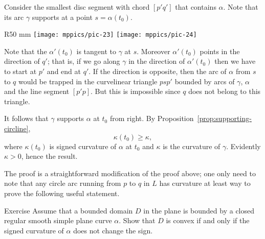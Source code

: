 Consider the smallest disc segment with chord $[p'q']$ that contains $\alpha$.
Note that its arc $\gamma$ supports at a point $s=\alpha(t_0)$.

\begin{wrapfigure}{R}{50 mm}
\centering
\texttt{[image: mppics/pic-23]}
\bigskip
\texttt{[image: mppics/pic-24]}
\vskip0mm
\end{wrapfigure}

Note that the $\alpha'(t_0)$ is tangent to $\gamma$ at $s$.
Moreover $\alpha'(t_0)$ points in the direction of $q'$;
that is, if we go along $\gamma$ in the direction  of $\alpha'(t_0)$ then we have to start at $p'$ and end at $q'$.
If the direction is opposite, then the arc of $\alpha$ from $s$ to $q$ would be trapped in the curvelinear triangle $psp'$ bounded by arcs of $\gamma$, $\alpha$ and the line segment $[p'p]$.
But this is impossible since $q$ does not belong to this triangle.



It follows that $\gamma$ supports $\alpha$ at $t_0$ from right.
By Proposition~\ref{prop:supporting-circline}, 
\[\kappa(t_0)\ge \kappa,\]
where $\kappa(t_0)$ is signed curvature of $\alpha$ at $t_0$ and $\kappa$ is the curvature of $\gamma$.
Evidently $\kappa>0$, hence the result.
\qeds






The proof is a straightforward modification of the proof above;
one only need to note that any circle arc running from $p$ to $q$ in $L$ has curvature at least
way to prove the following useful statement.

\begin{thm}{Exercise}
Assume that a bounded domain $D$ in the plane is bounded by a closed regular smooth simple plane curve $\alpha$.
Show that $D$ is convex if and only if the signed curvature of $\alpha$ does not change the sign.
\end{thm}

